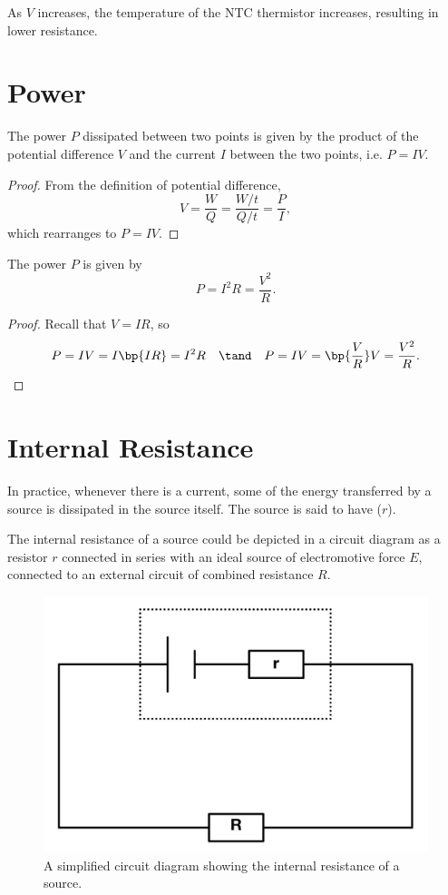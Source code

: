 As $V$ increases, the temperature of the NTC thermistor increases, resulting in lower resistance.

\section{Power}

\begin{proposition}
    The power $P$ dissipated between two points is given by the product of the potential difference $V$ and the current $I$ between the two points, i.e. $P = IV$.
\end{proposition}
\begin{proof}
    From the definition of potential difference, \[V = \frac{W}{Q} = \frac{W/t}{Q/t} = \frac{P}{I},\] which rearranges to $P = IV$.
\end{proof}

\begin{corollary}
    The power $P$ is given by \[P = I^2 R = \frac{V^2}{R}.\]
\end{corollary}
\begin{proof}
    Recall that $V = IR$, so \[P = IV = I\bp{IR} = I^2 R \quad \tand \quad P = IV = \bp{\frac{V}{R}}V = \frac{V^2}{R}.\]
\end{proof}

\section{Internal Resistance}

In practice, whenever there is a current, some of the energy transferred by a source is dissipated in the source itself. The source is said to have  ($r$).

The internal resistance of a source could be depicted in a circuit diagram as a resistor $r$ connected in series with an ideal source of electromotive force $E$, connected to an external circuit of combined resistance $R$.

\begin{figure}[H]
    \centering
    \includegraphics[scale=0.4]{media/Internal Resistance.jpg}
    \caption{A simplified circuit diagram showing the internal resistance of a source.\protect\footnotemark}
\end{figure}

